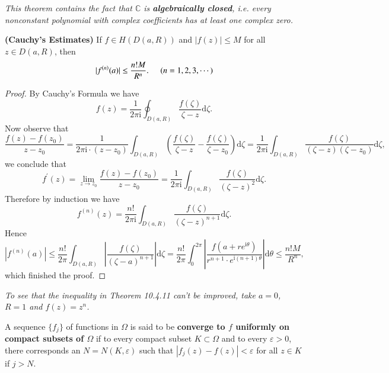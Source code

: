 \begin{note}\em
This theorem contains the fact that $\mathbb{C}$ is \textbf{algebraically closed}, i.e. every nonconstant polynomial with complex coefficients has at least one complex zero.
\end{note}
\begin{theorem}{\textbf{(Cauchy's Estimates)}}
If $f\in H(D(a,R))$ and $|f(z)|\le M$ for all $z\in D(a,R)$, then 
$$|f^{(n)}(a)|\le\frac{n!M}{R^n}.\hspace{0.5cm}(n=1,2,3,\cdots)$$
\end{theorem}
\begin{proof}
By Cauchy's Formula we have 
$$
f\left( z \right) =\frac{1}{2\pi \mathrm{i}}\oint_{D\left( a,R \right)}{\frac{f\left( \zeta \right)}{\zeta -z}\mathrm{d}\zeta}.
$$
Now observe that 
$$
\frac{f\left( z \right) -f\left( z_0 \right)}{z-z_0}=\frac{1}{2\pi \mathrm{i}\cdot \left( z-z_0 \right)}\int_{D\left( a,R \right)}{\left( \frac{f\left( \zeta \right)}{\zeta -z}-\frac{f\left( \zeta \right)}{\zeta -z_0} \right) \mathrm{d}\zeta}=\frac{1}{2\pi \mathrm{i}}\int_{D\left( a,R \right)}{\frac{f\left( \zeta \right)}{\left( \zeta -z \right) \left( \zeta -z_0 \right)}\mathrm{d}\zeta},
$$
we conclude that 
$$
f^{\prime}\left( z \right) =\lim_{z\rightarrow z_0} \frac{f\left( z \right) -f\left( z_0 \right)}{z-z_0}=\frac{1}{2\pi \mathrm{i}}\int_{D\left( a,R \right)}{\frac{f\left( \zeta \right)}{\left( \zeta -z \right) ^2}\mathrm{d}\zeta}.
$$
Therefore by induction we have  
$$
f^{\left( n \right)}\left( z \right) =\frac{n!}{2\pi \mathrm{i}}\int_{D\left( a,R \right)}{\frac{f\left( \zeta \right)}{\left( \zeta -z \right) ^{n+1}}\mathrm{d}\zeta}.
$$
Hence 
$$
\left| f^{\left( n \right)}\left( a \right) \right|\le \frac{n!}{2\pi}\int_{D\left( a,R \right)}{\left| \frac{f\left( \zeta \right)}{\left( \zeta -a \right) ^{n+1}} \right|\mathrm{d}\zeta}=\frac{n!}{2\pi}\int_0^{2\pi}{\left| \frac{f\left( a+re^{\mathrm{i}\theta} \right)}{r^{n+1}\cdot e^{\mathrm{i}\left( n+1 \right) \theta}} \right|\mathrm{d}\theta}\le \frac{n!M}{R^n},
$$
which finished the proof.
\end{proof}
\begin{note}\em
To see that the inequality in Theorem 10.4.11 can't be improved, take $a=0$, $R=1$ and $f(z)=z^n$.
\end{note}
\begin{definition}
A sequence $\{f_j\}$ of functions in $\Omega$ is said to be \textbf{converge to $f$ uniformly on compact subsets of $\Omega$} if to every compact subset $K\subset\Omega$ and to every $\varepsilon>0$, there corresponds an $N=N(K,\varepsilon)$ such that $|f_j(z)-f(z)|<\varepsilon$ for all $z\in K$ if $j>N$.
\end{definition}
